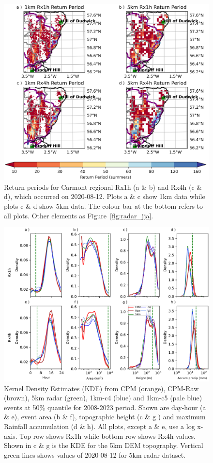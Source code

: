 \documentclass[11pt,a4paper]{article}
\begin{document}
\begin{figure}
	\centering
	\includegraphics[width=\linewidth]{map_return_prds}
	\caption{Return periods for Carmont regional Rx1h (a \& b) and Rx4h (c \& d), which occurred on 2020-08-12. Plots a \& c show 1km data while plots c \& d show 5km data. The colour bar at the bottom refers to all plots. Other elements as Figure~\ref{fig:radar_jja}. } 
	\label{fig:map_rtn_prd}
\end{figure}


\begin{figure}
	\centering
	\includegraphics[width=\linewidth]{kde_smooth_events}
	\caption{Kernel Density Estimates (KDE) from  CPM (orange), CPM-Raw (brown), 5km radar (green), 1km-c4 (blue) and 1km-c5 (pale blue) events at 50\% quantile for 2008-2023 period.
		 Shown are day-hour (a \& e), event area (b \& f),  topographic height (c \& g ) and maximum Rainfall accumulation (d \& h). All plots, except a \& e, use a log x-axis. 
		  Top row shows Rx1h while bottom row shows Rx4h values. Shown in c \& g is the KDE for the 5km DEM topography. Vertical green lines shows values of 2020-08-12 for 5km radar dataset.}
	\label{fig:kde_smooth_events}
\end{figure}
\end{document}
